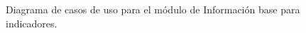  \begin{figure}[h!]
     \begin{center}
     \caption{Diagrama de casos de uso para el módulo de Información base para indicadores.}
     \label{fig:casosUso:movil}
     \end{center}
 \end{figure}

